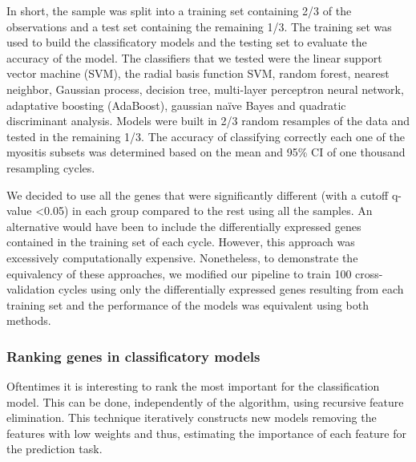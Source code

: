 In short, the sample was split into a training set containing 2/3 of the observations and a test set containing the remaining 1/3. The training set was used to build the classificatory models and the testing set to evaluate the accuracy of the model. The classifiers that we tested were the linear support vector machine (SVM), the radial basis function SVM, random forest, nearest neighbor, Gaussian process, decision tree, multi-layer perceptron neural network, adaptative boosting (AdaBoost), gaussian naïve Bayes and quadratic discriminant analysis. Models were built in 2/3 random resamples of the data and tested in the remaining 1/3. The accuracy of classifying correctly each one of the myositis subsets was determined based on the mean and 95\% CI of one thousand resampling cycles.

We decided to use all the genes that were significantly different (with a cutoff q-value <0.05) in each group compared to the rest using all the samples. An alternative would have been to include the differentially expressed genes contained in the training set of each cycle. However, this approach was excessively computationally expensive. Nonetheless, to demonstrate the equivalency of these approaches, we modified our pipeline to train 100 cross-validation cycles using only the differentially expressed genes resulting from each training set and the performance of the models was equivalent using both methods.

\subsubsection{Ranking genes in classificatory models}
Oftentimes it is interesting to rank the most important for the classification model. This can be done, independently of the algorithm, using recursive feature elimination.\cite{Guyon2002} This technique iteratively constructs new models removing the features with low weights and thus, estimating the importance of each feature for the prediction task.